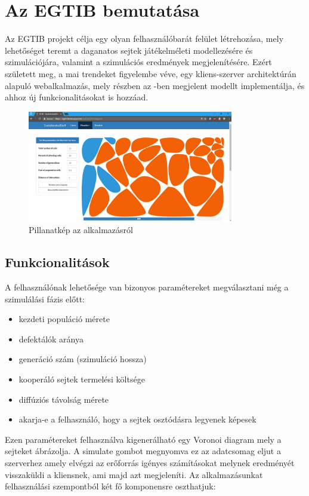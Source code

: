 \newcommand{\projectName}{Az EGTIB}

\chapter{\projectName{} bemutatása}

\projectName{} projekt célja egy olyan felhasználóbarát felület létrehozása, mely lehetőséget teremt a daganatos sejtek játékelméleti modellezésére és szimulációjára, valamint a szimulációs eredmények megjelenítésére. Ezért született meg, a mai trendeket figyelembe véve, egy kliens-szerver architektúrán alapuló webalkalmazás, mely részben az \cite{archetti2016cooperation}-ben megjelent modellt implementálja, és ahhoz új funkcionalitásokat is hozzáad.

\begin{figure}[ht!]
	\centering
	\includegraphics[width=90mm]{images/EGTIB.jpg}
	\caption{Pillanatkép az alkalmazásról \label{fig:SimulateWithDiagram}}
\end{figure}

\section{Funkcionalitások}

A felhasználónak lehetősége van bizonyos paramétereket megválasztani még a szimulálási fázis előtt:
\begin{itemize}[noitemsep]
	\item kezdeti populáció mérete
	\item defektálók aránya 
	\item generáció szám (szimuláció hossza)
	\item kooperáló sejtek termelési költsége 
	\item diffúziós távolság mérete
	\item akarja-e a felhasználó, hogy a sejtek osztódásra legyenek képesek
\end{itemize}
Ezen paramétereket felhasználva kigenerálható egy Voronoi diagram mely a sejteket ábrázolja. A simulate gombot megnyomva ez az adatcsomag eljut a szerverhez amely elvégzi az erőforrás igényes számításokat melynek eredményét visszaküldi a kliensnek, ami majd azt megjeleníti.
Az alkalmazásunkat felhasználási szempontból két fő komponensre oszthatjuk:

